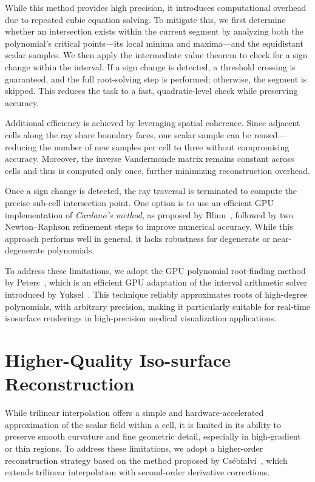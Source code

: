\documentclass[conference]{IEEEtran}
\begin{document}
While this method provides high precision, it introduces computational overhead due to repeated cubic equation solving. To mitigate this, we first determine whether an intersection exists within the current segment by analyzing both the polynomial’s critical points—its local minima and maxima—and the equidistant scalar samples. We then apply the intermediate value theorem to check for a sign change within the interval. If a sign change is detected, a threshold crossing is guaranteed, and the full root-solving step is performed; otherwise, the segment is skipped. This reduces the task to a fast, quadratic-level check while preserving accuracy.

Additional efficiency is achieved by leveraging spatial coherence. Since adjacent cells along the ray share boundary faces, one scalar sample can be reused—reducing the number of new samples per cell to three without compromising accuracy. Moreover, the inverse Vandermonde matrix remains constant across cells and thus is computed only once, further minimizing reconstruction overhead.

Once a sign change is detected, the ray traversal is terminated to compute the precise sub-cell intersection point. One option is to use an efficient GPU implementation of \textit{Cardano’s method}, as proposed by Blinn~\cite{blinn2007solve}, followed by two Newton–Raphson refinement steps to improve numerical accuracy. While this approach performs well in general, it lacks robustness for degenerate or near-degenerate polynomials.

To address these limitations, we adopt the GPU polynomial root-finding method by Peters~\cite{peters2023ray}, which is an efficient GPU adaptation of the interval arithmetic solver introduced by Yuksel~\cite{yuksel2022fast}. This technique reliably approximates roots of high-degree polynomials, with arbitrary precision, making it particularly suitable for real-time isosurface renderings in high-precision medical visualization applications.

\section{Higher-Quality Iso-surface Reconstruction}

While trilinear interpolation offers a simple and hardware-accelerated approximation of the scalar field within a cell, it is limited in its ability to preserve smooth curvature and fine geometric detail, especially in high-gradient or thin regions. To address these limitations, we adopt a higher-order reconstruction strategy based on the method proposed by Csébfalvi~\cite{csebfalvi2019beyond}, which extends trilinear interpolation with second-order derivative corrections.
\end{document}
